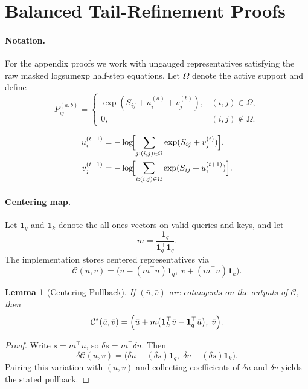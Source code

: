 \documentclass{article}
\newtheorem{lemma}{Lemma}
\begin{document}
\section{Balanced Tail-Refinement Proofs}
\label{app:proofs}

\paragraph{Notation.}
For the appendix proofs we work with ungauged representatives satisfying the raw masked logsumexp half-step equations. Let $\Omega$ denote the active support and define
\[
P^{(a,b)}_{ij} =
\begin{cases}
\exp(S_{ij}+u_i^{(a)}+v_j^{(b)}), & (i,j)\in\Omega, \\
0, & (i,j)\notin\Omega.
\end{cases}
\]

\begin{align}
    u_i^{(t+1)} &= -\log\!\Bigl[\sum_{j:(i,j)\in\Omega} \exp(S_{ij} + v_j^{(t)})\Bigr], \label{eq:u_update_app_unified}\\
    v_j^{(t+1)} &= -\log\!\Bigl[\sum_{i:(i,j)\in\Omega} \exp(S_{ij} + u_i^{(t+1)})\Bigr]. \label{eq:v_update_app_unified}
\end{align}

\paragraph{Centering map.}
Let $\mathbf{1}_q$ and $\mathbf{1}_k$ denote the all-ones vectors on valid queries and keys, and let
\[
m = \frac{\mathbf{1}_q}{\mathbf{1}_q^\top\mathbf{1}_q}.
\]
The implementation stores centered representatives via
\[
\mathcal{C}(u,v)=\bigl(u-(m^\top u)\mathbf{1}_q,\; v+(m^\top u)\mathbf{1}_k\bigr).
\]

\begin{lemma}[Centering Pullback]
If $(\bar u,\bar v)$ are cotangents on the outputs of $\mathcal{C}$, then
\[
\mathcal{C}^*(\bar u,\bar v)
=
\Bigl(
\bar u + m\bigl(\mathbf{1}_k^\top \bar v - \mathbf{1}_q^\top \bar u\bigr),
\;
\bar v
\Bigr).
\]
\end{lemma}

\begin{proof}
Write $s=m^\top u$, so $\delta s = m^\top \delta u$. Then
\[
\delta \mathcal{C}(u,v)
=
\bigl(\delta u-(\delta s)\mathbf{1}_q,\; \delta v+(\delta s)\mathbf{1}_k\bigr).
\]
Pairing this variation with $(\bar u,\bar v)$ and collecting coefficients of $\delta u$ and $\delta v$ yields the stated pullback.
\end{proof}
\end{document}
